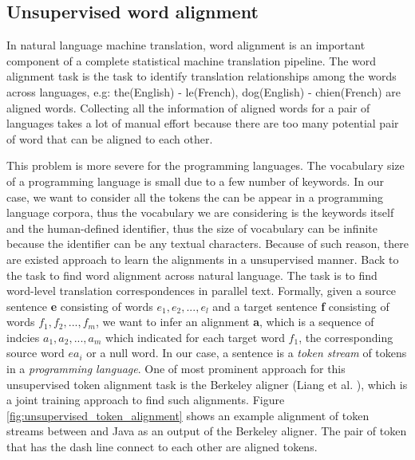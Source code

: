 \subsection{ Unsupervised word alignment}

In natural language machine translation, word alignment is an important component of a complete statistical machine translation pipeline. The word alignment task is the task to identify translation relationships among the words across languages, e.g: the(English) - le(French), dog(English) - chien(French) are aligned words. Collecting all the information of aligned words for a pair of languages takes a lot of manual effort because there are too many potential pair of word that can be aligned to each other. 

This problem is more severe for the programming languages. The vocabulary size of a programming language is small due to a few number of keywords. In our case, we want to consider all the tokens the can be appear in a programming language corpora, thus the vocabulary we are considering is the keywords itself and the human-defined identifier, thus the size of vocabulary can be infinite because the identifier can be any textual characters. Because of such reason, there are existed approach to learn the alignments in a unsupervised manner. Back to the task to find word alignment across natural language. The task is to find word-level translation correspondences in parallel text. Formally, given a source sentence \textbf{e} consisting of words \begin{math} e_{1}, e_{2}, ...,e_{l}\end{math} and a target sentence \textbf{f} consisting of words \begin{math} f_{1}, f_{2}, ...,f_{m}\end{math}, we want to infer an alignment \textbf{a}, which is a sequence of indcies \begin{math} a_{1}, a_{2}, ...,a_{m}\end{math} which indicated for each target word \begin{math} f_{1}\end{math}, the corresponding source word \begin{math}e{a_{i}}\end{math} or a null word. In our case, a sentence is a \textit{token stream} of tokens in a \textit{programming language}. One of most prominent approach for this unsupervised token alignment task is the Berkeley aligner (Liang et al. \cite{liang2006alignment}), which is a joint training approach to find such alignments. Figure \ref{fig:unsupervised_token_alignment} shows an example alignment  of token streams between  and Java as an output of the Berkeley aligner. The pair of token that has the dash line connect to each other are aligned tokens.

